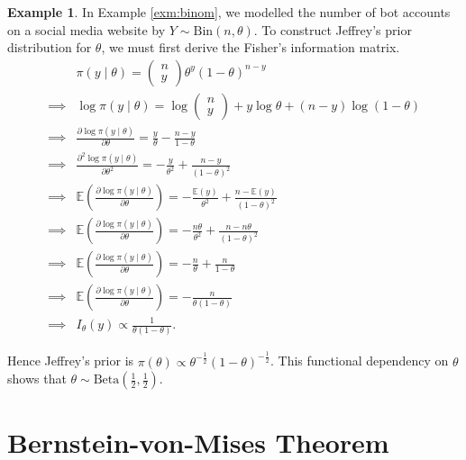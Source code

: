 \documentclass[
]{book}
\theoremstyle{definition}
\theoremstyle{definition}
\newtheorem{example}{Example}[chapter]
\theoremstyle{definition}
\theoremstyle{definition}
\theoremstyle{remark}
\begin{document}
\begin{example}
In Example \ref{exm:binom}, we modelled the number of bot accounts on a social media website by \(Y \sim \textrm{Bin}(n, \theta)\). To construct Jeffrey's prior distribution for \(\theta\), we must first derive the Fisher's information matrix.\\
\begin{align*}
&\pi(y \mid \theta) = \begin{pmatrix} n \\ y \end{pmatrix} \theta^y (1-\theta)^{n-y}\\ 
\implies &\log \pi(y \mid \theta) = \log \begin{pmatrix} n \\ y \end{pmatrix} + y \log\theta + (n-y)\log(1-\theta) \\
\implies &\frac{\partial \log \pi(y \mid \theta)}{\partial \theta} = \frac{y}{\theta} - \frac{n-y}{1-\theta} \\
\implies &\frac{\partial^2 \log \pi(y \mid \theta)}{\partial \theta^2} = -\frac{y}{\theta^2} + \frac{n-y}{(1-\theta)^2} \\
\implies &\mathbb{E}\left(\frac{\partial \log \pi(y \mid \theta)}{\partial \theta}\right) = -\frac{\mathbb{E}(y)}{\theta^2} + \frac{n-\mathbb{E}(y)}{(1-\theta)^2}\\ 
\implies &\mathbb{E}\left(\frac{\partial \log \pi(y \mid \theta)}{\partial \theta}\right) = -\frac{n\theta}{\theta^2} + \frac{n-n\theta}{(1-\theta)^2}\\ 
\implies &\mathbb{E}\left(\frac{\partial \log \pi(y \mid \theta)}{\partial \theta}\right) = -\frac{n}{\theta} + \frac{n}{1-\theta}\\
\implies &\mathbb{E}\left(\frac{\partial \log \pi(y \mid \theta)}{\partial \theta}\right) = -\frac{n}{\theta(1-\theta)} \\
\implies &I_\theta(y) \propto \frac{1}{\theta(1-\theta)}.
\end{align*}

Hence Jeffrey's prior is \(\pi(\theta) \propto \theta^{-\frac{1}{2}}(1-\theta)^{-\frac{1}{2}}\). This functional dependency on \(\theta\) shows that \(\theta \sim \textrm{Beta}(\frac{1}{2}, \frac{1}{2})\).
\end{example}

\hypertarget{bernstein-von-mises-theorem}{%
\section{Bernstein-von-Mises Theorem}\label{bernstein-von-mises-theorem}}
\end{document}
